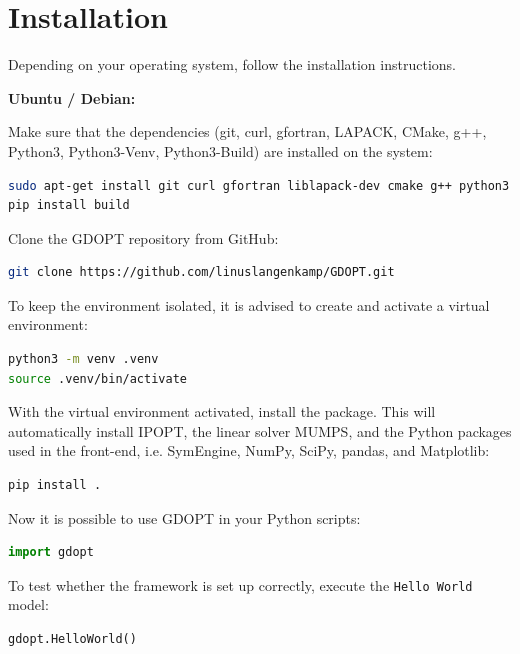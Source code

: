 \documentclass[12pt]{article}
\begin{document}
\section{Installation}

Depending on your operating system, follow the installation instructions.

\begin{mdframed}[backgroundcolor=gray!10, roundcorner=10pt,
		linewidth=1pt]

	\textbf{Ubuntu / Debian:}

	Make sure that the dependencies (git, curl, gfortran, LAPACK, CMake, g++,
	Python3, Python3-Venv, Python3-Build) are installed on the system:

\begin{lstlisting}[language=bash]
sudo apt-get install git curl gfortran liblapack-dev cmake g++ python3 python3-venv
pip install build
\end{lstlisting}

Clone the GDOPT repository from GitHub:

\begin{lstlisting}[language=bash]
git clone https://github.com/linuslangenkamp/GDOPT.git
\end{lstlisting}

	To keep the environment isolated, it is advised to create and activate a
	virtual environment:

	\begin{lstlisting}[language=bash]
python3 -m venv .venv
source .venv/bin/activate
\end{lstlisting}

	With the virtual environment activated, install the package. This will
	automatically install
	IPOPT\cite{wachter2006implementation}, the linear solver
	MUMPS\cite{amestoy2001fully}, and the Python packages used in the front-end,
	i.e. SymEngine\cite{symengine}, NumPy\cite{harris2020array},
	SciPy\cite{virtanen2020scipy}, pandas\cite{mckinney2010data}, and
	Matplotlib\cite{hunter2007matplotlib}:

	\begin{lstlisting}[language=bash]
pip install .
\end{lstlisting}

Now it is possible to use GDOPT in your Python scripts:
\begin{lstlisting}[language=python]
import gdopt
\end{lstlisting}

To test whether the framework is set up correctly, execute the \texttt{Hello World} model:
\begin{lstlisting}[language=python]
gdopt.HelloWorld()
\end{lstlisting}

\end{mdframed}
\end{document}
